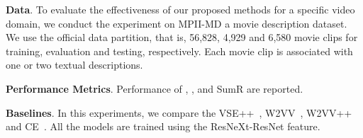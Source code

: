 \begin{table*} [tb!]
\renewcommand{\arraystretch}{1.2}
\caption{\textbf{Performance of Dual encoding with distinct common spaces}. Dataset: MSR-VTT.}
\label{tab:ablation-space}
\centering 
{}\end{table*}


\textbf{Data}. 
To evaluate the effectiveness of our proposed methods for a specific video domain, we conduct the experiment on MPII-MD \cite{rohrbach2015dataset} a movie description dataset.
We use the official data partition, that is, 56,828, 4,929 and 6,580 movie clips for training, evaluation and testing, respectively. 
Each movie clip is associated with one or two textual descriptions.

\textbf{Performance Metrics}. 
Performance of , ,  and SumR are reported.

\textbf{Baselines}. In this experiments, we compare the VSE++~\cite{faghri2017vse}, W2VV~\cite{dong2018predicting}, W2VV++~\cite{li2019w2vv++} and CE~\cite{liu2019use}. All the models are trained using the  ResNeXt-ResNet feature.

